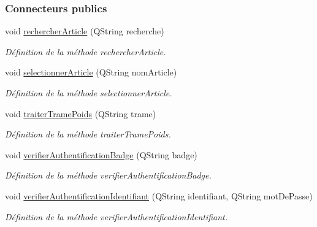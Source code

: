 \subsubsection*{Connecteurs publics}
\begin{DoxyCompactItemize}
\item 
void \hyperlink{class_supervision_af2df200be6727338110b81812703d0ae}{rechercher\+Article} (Q\+String recherche)
\begin{DoxyCompactList}\small\item\em Définition de la méthode rechercher\+Article. \end{DoxyCompactList}\item 
void \hyperlink{class_supervision_a2efb7e4dabe2664c9cfd41d703b6250c}{selectionner\+Article} (Q\+String nom\+Article)
\begin{DoxyCompactList}\small\item\em Définition de la méthode selectionner\+Article. \end{DoxyCompactList}\item 
void \hyperlink{class_supervision_ae72bdcb7d70bbb8e13cf61be95ee7c06}{traiter\+Trame\+Poids} (Q\+String trame)
\begin{DoxyCompactList}\small\item\em Définition de la méthode traiter\+Trame\+Poids. \end{DoxyCompactList}\item 
void \hyperlink{class_supervision_a07e7f0cd8b114182be56ebb5645e62fe}{verifier\+Authentification\+Badge} (Q\+String badge)
\begin{DoxyCompactList}\small\item\em Définition de la méthode verifier\+Authentification\+Badge. \end{DoxyCompactList}\item 
void \hyperlink{class_supervision_ac596674d302f1f747d65c8334aa1ced9}{verifier\+Authentification\+Identifiant} (Q\+String identifiant, Q\+String mot\+De\+Passe)
\begin{DoxyCompactList}\small\item\em Définition de la méthode verifier\+Authentification\+Identifiant. \end{DoxyCompactList}\end{DoxyCompactItemize}
